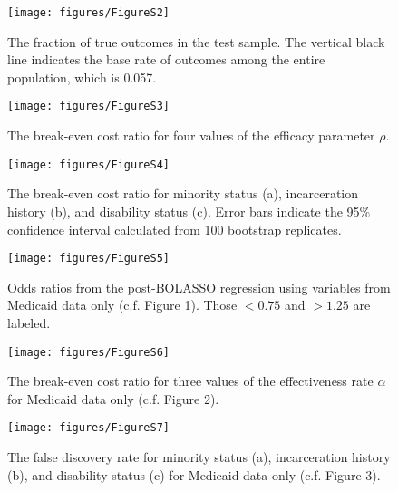 \documentclass[9pt,twoside]{pnas-new}
\begin{document}
\begin{figure}
\caption{The fraction of true outcomes in the test sample. The vertical black line indicates the base rate of outcomes among the entire population, which is 0.057.}
\centering
\texttt{[image: figures/FigureS2]}
\end{figure}

\begin{figure}
\caption{The break-even cost ratio for four values of the efficacy parameter $\rho$.}
\centering
\texttt{[image: figures/FigureS3]}
\end{figure}

\begin{figure}
\caption{The break-even cost ratio for minority status (a), incarceration history (b), and disability status (c). Error bars indicate the 95\% confidence interval calculated from 100 bootstrap replicates.}
\centering
\texttt{[image: figures/FigureS4]}
\end{figure}

\begin{figure}
\caption{Odds ratios from the post-BOLASSO regression using variables from Medicaid data only (c.f. Figure 1). Those $<0.75$ and $>1.25$ are labeled.}
\centering
\texttt{[image: figures/FigureS5]}
\end{figure}

\begin{figure}
\caption{The break-even cost ratio for three values of the effectiveness rate $\alpha$ for Medicaid data only (c.f. Figure 2).}
\centering
\texttt{[image: figures/FigureS6]}
\end{figure}

\begin{figure}
\caption{The false discovery rate for minority status (a), incarceration history (b), and disability status (c) for Medicaid data only (c.f. Figure 3).}
\centering
\texttt{[image: figures/FigureS7]}
\end{figure}
\end{document}
